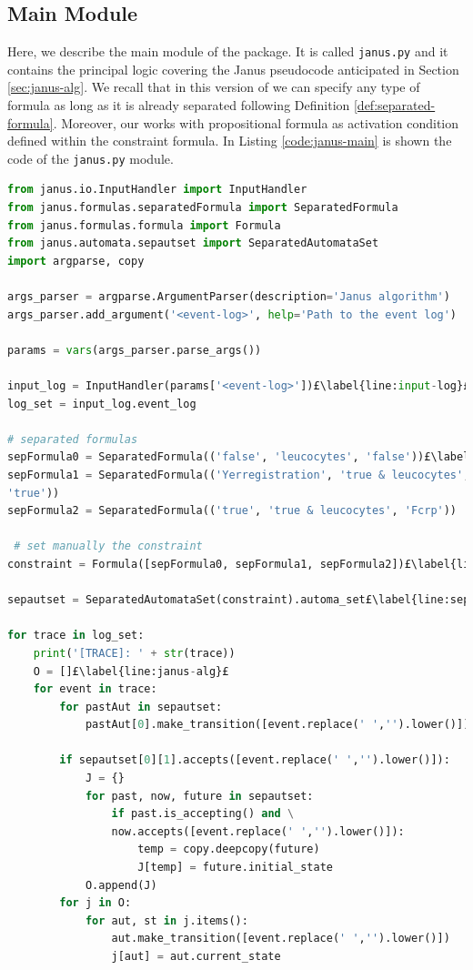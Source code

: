 \subsection{Main Module}\label{sec:janus-main}
Here, we describe the main module of the \janus package. It is called \texttt{janus.py} and it contains the principal logic covering the Janus pseudocode anticipated in Section \ref{sec:janus-alg}. We recall that in this version of \janus we can specify any type of \LTLp formula as long as it is already separated following Definition \ref{def:separated-formula}. Moreover, our \janus works with propositional formula as activation condition defined within the constraint formula. In Listing \ref{code:janus-main} is shown the code of the \texttt{janus.py} module.
\begin{lstlisting}[language=Python, style=Python, escapechar = £, label={code:janus-main}, caption={The \texttt{janus.py} module}]
from janus.io.InputHandler import InputHandler
from janus.formulas.separatedFormula import SeparatedFormula
from janus.formulas.formula import Formula
from janus.automata.sepautset import SeparatedAutomataSet
import argparse, copy

args_parser = argparse.ArgumentParser(description='Janus algorithm')
args_parser.add_argument('<event-log>', help='Path to the event log')

params = vars(args_parser.parse_args())

input_log = InputHandler(params['<event-log>'])£\label{line:input-log}£
log_set = input_log.event_log

# separated formulas
sepFormula0 = SeparatedFormula(('false', 'leucocytes', 'false'))£\label{line:sep-formulas}£
sepFormula1 = SeparatedFormula(('Yerregistration', 'true & leucocytes', \
'true'))
sepFormula2 = SeparatedFormula(('true', 'true & leucocytes', 'Fcrp'))

 # set manually the constraint
constraint = Formula([sepFormula0, sepFormula1, sepFormula2])£\label{line:constraint}£

sepautset = SeparatedAutomataSet(constraint).automa_set£\label{line:sep-aut-set}£

for trace in log_set:
    print('[TRACE]: ' + str(trace))
    O = []£\label{line:janus-alg}£
    for event in trace:
        for pastAut in sepautset:
            pastAut[0].make_transition([event.replace(' ','').lower()])

        if sepautset[0][1].accepts([event.replace(' ','').lower()]):
            J = {}
            for past, now, future in sepautset:
                if past.is_accepting() and \
                now.accepts([event.replace(' ','').lower()]):
                    temp = copy.deepcopy(future)
                    J[temp] = future.initial_state
            O.append(J)
        for j in O:
            for aut, st in j.items():
                aut.make_transition([event.replace(' ','').lower()])
                j[aut] = aut.current_state


\end{lstlisting}
